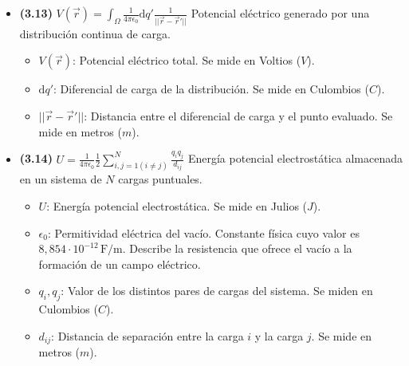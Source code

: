 \documentclass{article}
\begin{document}
\begin{itemize}
				\item \textbf{(3.13)} $\boxed{V(\vec{r}) = \int_\Omega \frac{1}{4\pi\epsilon_0} \mathrm{d}q' \frac{1}{\vert{}\vert{}\vec{r} - \vec{r}'\vert{}\vert{}}}$ Potencial eléctrico generado por una distribución continua de carga.
					\begin{itemize}
						\item $V(\vec{r})$: Potencial eléctrico total. Se mide en Voltios ($V$).
						\item $\mathrm{d}q'$: Diferencial de carga de la distribución. Se mide en Culombios ($C$).
						\item $\vert{}\vert{}\vec{r} - \vec{r}'\vert{}\vert{}$: Distancia entre el diferencial de carga y el punto evaluado. Se mide en metros ($m$).
					\end{itemize}

				\item \textbf{(3.14)} $\boxed{U = \frac{1}{4\pi\epsilon_0} \frac{1}{2} \sum_{i,j=1 (i\neq j)}^N \frac{q_i q_j}{d_{ij}}}$ Energía potencial electrostática almacenada en un sistema de $N$ cargas puntuales.
					\begin{itemize}
						\item $U$: Energía potencial electrostática. Se mide en Julios ($J$).
						\item $\epsilon_{0}$: Permitividad eléctrica del vacío. Constante física cuyo valor es $8,854\cdot10^{-12}\,\text{F/m}$. Describe la resistencia que ofrece el vacío a la formación de un campo eléctrico.
						\item $q_i, q_j$: Valor de los distintos pares de cargas del sistema. Se miden en Culombios ($C$).
						\item $d_{ij}$: Distancia de separación entre la carga $i$ y la carga $j$. Se mide en metros ($m$).
					\end{itemize}


\end{itemize}
\end{document}
